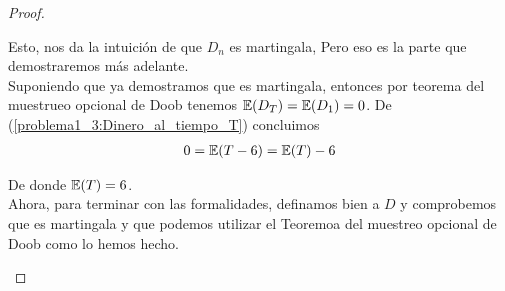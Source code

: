 \begin{proof}
\begin{enumerate}
		   	Esto, nos da la intuición de que $D_n$ es martingala, Pero eso es la parte que demostraremos más adelante.\\
		   
			Suponiendo que ya demostramos que es martingala, entonces por teorema del muestrueo opcional de Doob
			tenemos $\mathbb{E}(D_T) = \mathbb{E}(D_1) = 0$. De (\ref{problema1_3:Dinero_al_tiempo_T}) concluimos
			\begin{align}
				0 = \mathbb{E}(T - 6) = \mathbb{E}(T) - 6
			\end{align}
			
			De donde $\mathbb{E}(T) = 6$.\\
			
			Ahora, para terminar con las formalidades, definamos bien a $D$ y comprobemos que es martingala y 
			que podemos utilizar el Teoremoa del muestreo opcional de Doob como lo hemos hecho.    
	\end{enumerate}
\end{proof}